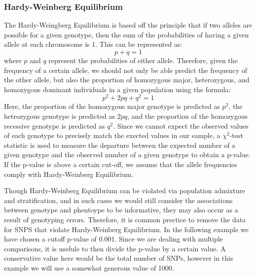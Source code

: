 \documentclass[11pt]{article}\usepackage[]{graphicx}\usepackage[]{color}
\begin{document}
\subsubsection*{Hardy-Weinberg Equilibrium}
The Hardy-Weingberg Equilibrium is based off the principle that if two alleles are possible for a given genotype, then the sum of the probabilities of having a given allele at each chromosome is 1. This can be represented as:
$$p+q=1$$
where $p$ and $q$ represent the probabilities of either allele. Therefore, given the frequency of a certain allele, we should not only be able predict the frequency of the other allele, but also the proportion of homozygous major, heterozygous, and homozygous dominant individuals in a given population  using the formula:
$$p^2 +2pq+q^2=1$$
Here, the proportion of the homozygous major genotype is predicted as $p^2$, the hetrozygous genotype is predicted as $2pq$, and the proportion of the homozygous recessive genotype is predicted as $q^2$. Since we cannot expect the observed values of each genotype to precisely match the exected values in our sample, a $\chi^2$-test statistic is used to measure the departure between the expected number of a given genotype and the observed number of a given genotype to obtain a p-value.  If the p-value is above a certain cut-off, we assume that the allele frequencies comply with Hardy-Weinberg Equilibrium. 

Though Hardy-Weinberg Equilibrium can be violated via population admixture and stratification, and in such cases we would still consider the associations between genotype and phentoype to be informative, they may also occur as a result of genotyping errors.  Therefore, it is common prectice to remove the data for SNPS that violate Hardy-Weinberg Equilibrium. In the following example we have chosen a cutoff p-value of 0.001.  Since we are dealing with multiple comparisons, it is usefule to then divide the p-value by a certain value. A conservative value here would be the total number of SNPs, however in this example we will use a somewhat generous value of 1000.
\end{document}
